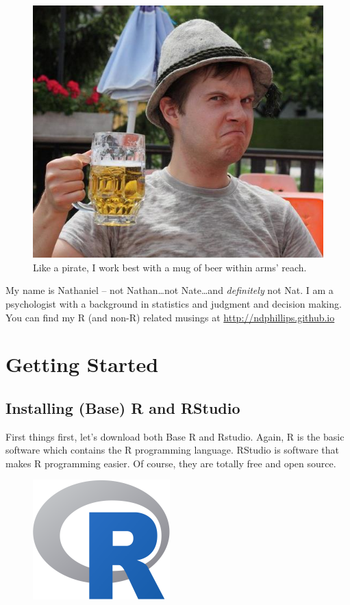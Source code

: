 \documentclass[]{book}
\theoremstyle{definition}
\theoremstyle{definition}
\theoremstyle{remark}
\begin{document}
\begin{figure}

{\centering \includegraphics[width=7.49in]{images/beer} 

}

\caption{Like a pirate, I work best with a mug of beer within arms' reach.}\label{fig:unnamed-chunk-6}
\end{figure}

My name is Nathaniel -- not Nathan\ldots{}not Nate\ldots{}and
\emph{definitely} not Nat. I am a psychologist with a background in
statistics and judgment and decision making. You can find my R (and
non-R) related musings at \url{http://ndphillips.github.io}

\chapter{Getting Started}\label{started}

\section{Installing (Base) R and
RStudio}\label{installing-base-r-and-rstudio}

First things first, let's download both Base R and Rstudio. Again, R is
the basic software which contains the R programming language. RStudio is
software that makes R programming easier. Of course, they are totally
free and open source.

\begin{figure}
\includegraphics[width=200px]{images/rlogo} \end{figure}
\end{document}
